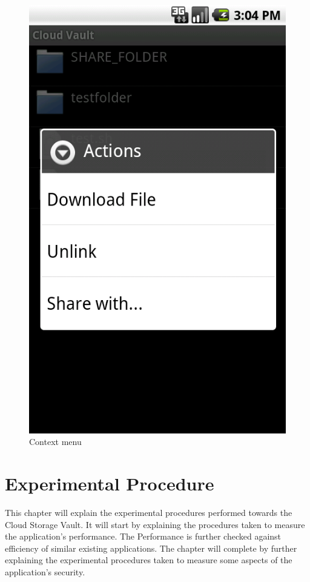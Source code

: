 \documentclass[pdftex,english,10pt,b5paper,twoside]{book}
\begin{document}
\begin{figure}[h!]
    \centering
    \includegraphics[scale=0.4]{client-browsecontext.png}
    \caption{Context menu}
    \label{fig:CSVAndroid:remotecontext}
\end{figure}

\chapter{Experimental Procedure}
This chapter will explain the experimental procedures performed towards the Cloud
Storage Vault. It will start by explaining the
procedures taken to measure the application's performance. The Performance is
further checked against efficiency of similar existing applications.
The chapter will complete by further explaining the experimental procedures
taken to measure some aspects of the application's security.
\end{document}
